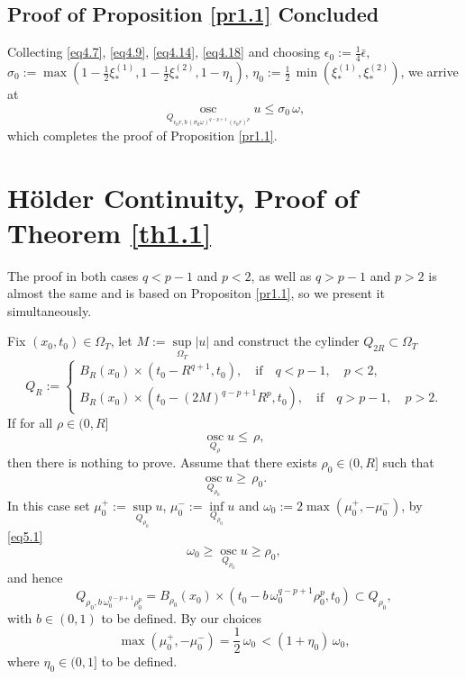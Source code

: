 \documentclass[a4paper,11pt,fullpage]{article}
\DeclareMathOperator*{\osc}{osc}
\numberwithin{equation}{section}
\begin{document}
\subsection{Proof of Proposition \ref{pr1.1} Concluded}
Collecting \eqref{eq4.7}, \eqref{eq4.9},  \eqref{eq4.14}, \eqref{eq4.18}  and choosing $\epsilon_0:=\frac{1}{4}\bar{\epsilon} $, $\sigma_0:=\max(1-\frac{1}{2}\xi^{(1)}_*, 1-\frac{1}{2}\xi^{(2)}_*, 1-\eta_1)$, $\eta_0:=\frac{1}{2}\,\min (\xi^{(1)}_*, \xi^{(2)}_*)$,  we arrive at
\begin{equation*}
\osc\limits_{Q_{\epsilon_0 r, b\, (\sigma_0 \omega)^{q-p+1} \,(\epsilon_0 r)^p}} u\leqslant \sigma_0\,\omega,
\end{equation*}
which completes the proof of Proposition \ref{pr1.1}.


\section{H\"{o}lder Continuity, Proof of Theorem \ref{th1.1}}

 The proof in both cases $q<p-1$ and $p<2$, as well as $q>p-1$ and $p>2$ is almost the same and is based on Propositon \ref{pr1.1}, so we present it simultaneously.
 
Fix $(x_0, t_0)\in \Omega_T$, let $M:=\sup\limits_{\Omega_T}|u|$ and construct the cylinder $Q_{2R}\subset \Omega_T$
$$
Q_{R}:=\begin{cases}
B_R(x_0)\times (t_0-R^{q+1}, t_0),\quad \text{if}\quad q<p-1,\quad p<2,\\
B_R(x_0)\times (t_0-(2M)^{q-p+1} R^p, t_0),\quad \text{if}\quad q>p-1,\quad p>2.
\end{cases}
$$
If for all $\rho \in (0, R]$
$$\osc\limits_{Q_\rho} u\leqslant \,\rho,$$
 then there is nothing to prove. Assume that there exists $\rho_0\in (0, R]$ such that
\begin{equation}\label{eq5.1}
\osc\limits_{Q_{\rho_0}} u\geqslant \,\rho_0.
\end{equation}
In this case set $\mu^+_0:=\sup\limits_{Q_{\rho_0}} u$, $\mu^-_0:=\inf\limits_{Q_{\rho_0}} u$ and $\omega_0:=2\max(\mu^+_0, -\mu^-_0)$,
by \eqref{eq5.1} 
$$\omega_0\geqslant \osc\limits_{Q_{\rho_0}} u\geqslant \rho_0,$$
and hence
$$Q_{\rho_0, b\,\omega^{q-p+1}_0\rho^p_0}=B_{\rho_0}(x_0)\times (t_0-b\,\omega^{q-p+1}_0 \rho^p_0, t_0)\subset Q_{\rho_0},$$
with $b\in (0, 1)$ to be defined.
By our choices
\begin{equation}\label{eq5.2}
\max(\mu^+_0, -\mu^-_0)=\frac{1}{2}\,\omega_0\,< (1+\eta_0)\,\omega_0,
\end{equation}
where $\eta_0\in (0, 1]$ to be defined.
\end{document}
